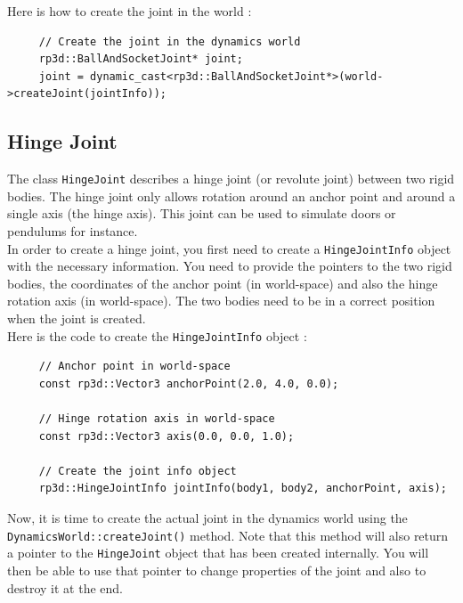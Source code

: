 \documentclass[a4paper,12pt]{article}
\begin{document}
    Here is how to create the joint in the world : \\

    \begin{lstlisting}
     // Create the joint in the dynamics world
     rp3d::BallAndSocketJoint* joint;
     joint = dynamic_cast<rp3d::BallAndSocketJoint*>(world->createJoint(jointInfo));
  \end{lstlisting}

    \vspace{0.6cm}

    \subsection{Hinge Joint}

    The class \texttt{HingeJoint} describes a hinge joint (or revolute joint) between two rigid bodies. The hinge joint only allows rotation around an anchor point and
    around a single axis (the hinge axis). This joint can be used to simulate doors or pendulums for instance. \\

    In order to create a hinge joint, you first need to create a \texttt{HingeJointInfo} object with the necessary information. You need to provide the pointers to the
    two rigid bodies, the coordinates of the anchor point (in world-space) and also the hinge rotation axis (in world-space). The two bodies need to be in a correct position
    when the joint is created. \\

    Here is the code to create the \texttt{HingeJointInfo} object : \\

    \begin{lstlisting}
     // Anchor point in world-space
     const rp3d::Vector3 anchorPoint(2.0, 4.0, 0.0);

     // Hinge rotation axis in world-space
     const rp3d::Vector3 axis(0.0, 0.0, 1.0);

     // Create the joint info object
     rp3d::HingeJointInfo jointInfo(body1, body2, anchorPoint, axis);
  \end{lstlisting}

    \vspace{0.6cm}

    Now, it is time to create the actual joint in the dynamics world using the \texttt{DynamicsWorld::createJoint()} method.
    Note that this method will also return a pointer to the \texttt{HingeJoint} object that has been created internally. You will then
    be able to use that pointer to change properties of the joint and also to destroy it at the end. \\
\end{document}
